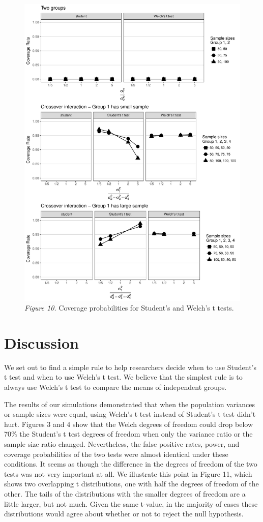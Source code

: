 \documentclass[man,a4paper,noextraspace,apacite]{apa6}
\begin{document}
\begin{figure}
\includegraphics{WelchManuscript-MASTER-CoveragePlots}
\textit{Figure 10.} Coverage probabilities for Student's and Welch's t tests.
\end{figure}

\section{Discussion}
    We set out to find a simple rule to help researchers decide when to use Student's t test and when to use Welch's t test. We believe that the simplest rule is to always use Welch's t test to compare the means of independent groups.
    
    The results of our simulations demonstrated that when the population variances or sample sizes were equal, using Welch's t test instead of Student's t test didn't hurt. Figures 3 and 4 show that the Welch degrees of freedom could drop below 70\% the Student's t test degrees of freedom when only the variance ratio or the sample size ratio changed. Nevertheless, the false positive rates, power, and coverage probabilities of the two tests were almost identical under these conditions. It seems as though the difference in the degrees of freedom of the two tests was not very important at all. We illustrate this point in Figure 11, which shows two overlapping t distributions, one with half the degrees of freedom of the other. The tails of the distributions with the smaller degrees of freedom are a little larger, but not much. Given the same t-value, in the majority of cases these distributions would agree about whether or not to reject the null hypothesis. 
    
\end{document}
